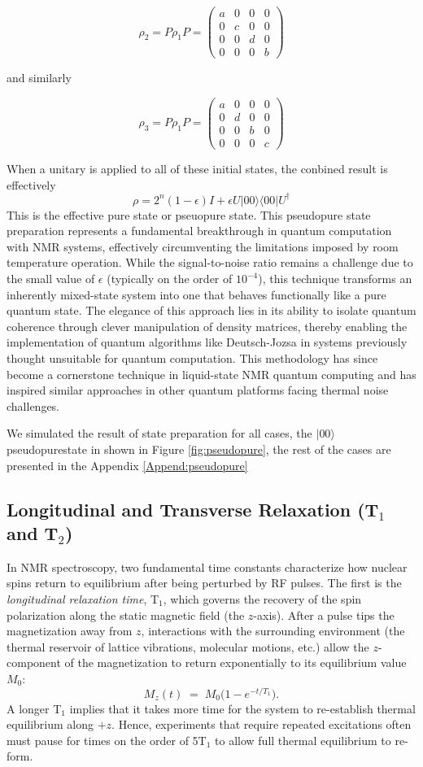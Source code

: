 \documentclass[%
 reprint,
 amsmath,amssymb,
 aps,
]{revtex4-2}
\begin{document}
\[
\rho_2 = P\rho_1P = 
\begin{pmatrix}
a & 0 & 0 & 0\\
0 & c & 0 & 0\\
0 & 0 & d & 0\\
0 & 0 & 0 & b
\end{pmatrix}
\]

and similarly

\[
\rho_3 = P\rho_1P = 
\begin{pmatrix}
a & 0 & 0 & 0\\
0 & d & 0 & 0\\
0 & 0 & b & 0\\
0 & 0 & 0 & c
\end{pmatrix}
\]

When a unitary is applied to all of these initial states, the conbined result is effectively
\[
\rho = 2^n(1-\epsilon)I + \epsilon U|00\rangle\langle00|U^{\dag}
\]
This is the effective pure state or pseuopure state.\cite{cory2000nmr}
This pseudopure state preparation represents a fundamental breakthrough in quantum computation with NMR systems, effectively circumventing the limitations imposed by room temperature operation. While the signal-to-noise ratio remains a challenge due to the small value of $\epsilon$ (typically on the order of $10^{-4}$), this technique transforms an inherently mixed-state system into one that behaves functionally like a pure quantum state. The elegance of this approach lies in its ability to isolate quantum coherence through clever manipulation of density matrices, thereby enabling the implementation of quantum algorithms like Deutsch-Jozsa in systems previously thought unsuitable for quantum computation. This methodology has since become a cornerstone technique in liquid-state NMR quantum computing and has inspired similar approaches in other quantum platforms facing thermal noise challenges.

We simulated the result of state preparation for all cases, the $|00\rangle$ pseudopurestate in shown in Figure \ref{fig:pseudopure}, the rest of the cases are presented in the Appendix \ref{Append:pseudopure}

\subsection{Longitudinal and Transverse Relaxation (T$_1$ and T$_2$)}
In NMR spectroscopy, two fundamental time constants characterize how nuclear spins return to equilibrium after being perturbed by RF pulses. The first is the \emph{longitudinal relaxation time}, T$_1$, which governs the recovery of the spin polarization along the static magnetic field (the $z$-axis). After a pulse tips the magnetization away from $z$, interactions with the surrounding environment (the thermal reservoir of lattice vibrations, molecular motions, etc.) allow the $z$-component of the magnetization to return exponentially to its equilibrium value $M_0$:
\[
M_z(t) \;=\; M_0 \bigl(1 - e^{-t/T_1}\bigr).
\]
A longer T$_1$ implies that it takes more time for the system to re-establish thermal equilibrium along $+z$. Hence, experiments that require repeated excitations often must pause for times on the order of 5T$_1$ to allow full thermal equilibrium to re-form.
\end{document}
